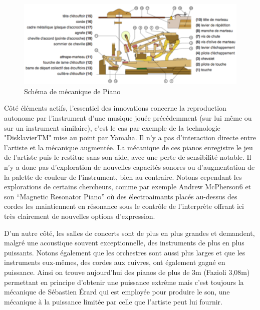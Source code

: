 \documentclass[french,a4paper,12pt]{report}
\begin{document}
	\begin{figure}[!ht]
    \center
    \includegraphics[width=15cm]{MECA_PIANO.png}
    \caption{Schéma de mécanique de Piano}
	\end{figure} 

Côté éléments actifs, l’essentiel des innovations concerne la reproduction autonome par l’instrument d’une musique jouée précédemment (sur lui même ou sur un instrument similaire), c’est le cas par exemple de la technologie "DisklavierTM" mise au point par Yamaha. Il n’y a pas d’interaction directe entre l’artiste et la mécanique augmentée. La mécanique de ces pianos enregistre le jeu de l’artiste puis le restitue sans son aide, avec une perte de sensibilité notable. Il n’y a donc pas d’exploration de nouvelles capacités sonores ou d’augmentation de la palette de couleur de l’instrument, bien au contraire. Notons cependant les explorations de certains chercheurs, comme par exemple Andrew McPherson6 et son “Magnetic Resonator Piano” où des électroaimants placés au-dessus des cordes les maintiennent en résonance sous le contrôle de l’interprète offrant ici très clairement de nouvelles options d’expression.

D’un autre côté, les salles de concerts sont de plus en plus grandes et demandent, malgré une acoustique souvent exceptionnelle, des instruments de plus en plus puissants. Notons également que les orchestres sont aussi plus larges et que les instruments eux-mêmes, des cordes aux cuivres, ont également gagné en puissance. Ainsi on trouve aujourd’hui des pianos de plus de 3m (Fazioli 3,08m) permettant en principe d’obtenir une puissance extrême mais c’est toujours la mécanique de Sébastien Érard qui est employée pour produire le son, une mécanique à la puissance limitée par celle que l’artiste peut lui fournir.
\end{document}
